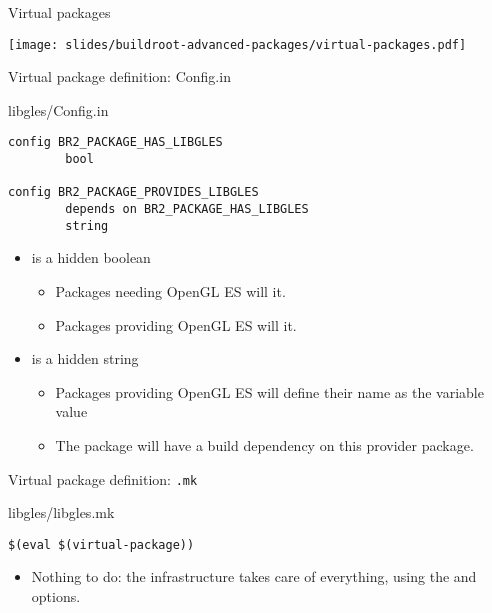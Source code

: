 \begin{frame}{Virtual packages}
  \begin{center}
    \texttt{[image: slides/buildroot-advanced-packages/virtual-packages.pdf]}
  \end{center}
\end{frame}

\begin{frame}[fragile]{Virtual package definition: Config.in}

\begin{block}{libgles/Config.in}
{\small
\begin{verbatim}
config BR2_PACKAGE_HAS_LIBGLES
        bool

config BR2_PACKAGE_PROVIDES_LIBGLES
        depends on BR2_PACKAGE_HAS_LIBGLES
        string
\end{verbatim}}
\end{block}

\begin{itemize}
\item {} is a hidden boolean
  \begin{itemize}
  \item Packages needing OpenGL ES will  it.
  \item Packages providing OpenGL ES will  it.
  \end{itemize}
\item {} is a hidden string
  \begin{itemize}
  \item Packages providing OpenGL ES will define their name as the
    variable value
  \item The  package will have a build dependency on
    this provider package.
  \end{itemize}
\end{itemize}

\end{frame}

\begin{frame}[fragile]{Virtual package definition: {\tt .mk}}

\begin{block}{libgles/libgles.mk}
\begin{verbatim}
$(eval $(virtual-package))
\end{verbatim}
\end{block}

\begin{itemize}

\item Nothing to do: the  infrastructure takes
  care of everything, using the  and
   options.

\end{itemize}

\end{frame}

